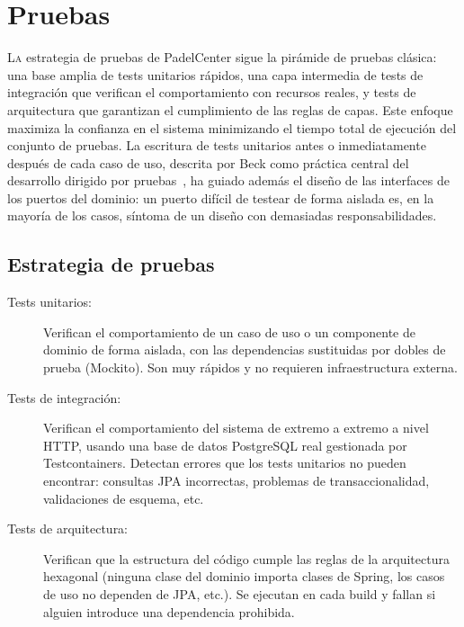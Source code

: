 \chapter{Pruebas}
\label{chap:pruebas}

\lettrine{L}{a} estrategia de pruebas de PadelCenter sigue la pirámide de
pruebas clásica: una base amplia de tests unitarios rápidos, una capa intermedia
de tests de integración que verifican el comportamiento con recursos reales, y
tests de arquitectura que garantizan el cumplimiento de las reglas de capas. Este
enfoque maximiza la confianza en el sistema minimizando el tiempo total de ejecución
del conjunto de pruebas. La escritura de tests unitarios antes o inmediatamente
después de cada caso de uso, descrita por Beck como práctica central del
desarrollo dirigido por pruebas~\cite{beck2002tdd}, ha guiado además el diseño
de las interfaces de los puertos del dominio: un puerto difícil de testear de
forma aislada es, en la mayoría de los casos, síntoma de un diseño con demasiadas
responsabilidades.

\section{Estrategia de pruebas}
\label{sec:estrategia_pruebas}

\begin{description}
  \item[Tests unitarios:] Verifican el comportamiento de un caso de uso o un
    componente de dominio de forma aislada, con las dependencias sustituidas por
    dobles de prueba (Mockito). Son muy rápidos y no requieren infraestructura
    externa.

  \item[Tests de integración:] Verifican el comportamiento del sistema de extremo
    a extremo a nivel HTTP, usando una base de datos PostgreSQL real gestionada
    por Testcontainers. Detectan errores que los tests unitarios no pueden encontrar:
    consultas JPA incorrectas, problemas de transaccionalidad, validaciones de
    esquema, etc.

  \item[Tests de arquitectura:] Verifican que la estructura del código cumple
    las reglas de la arquitectura hexagonal (ninguna clase del dominio importa
    clases de Spring, los casos de uso no dependen de JPA, etc.). Se ejecutan
    en cada build y fallan si alguien introduce una dependencia prohibida.
\end{description}

